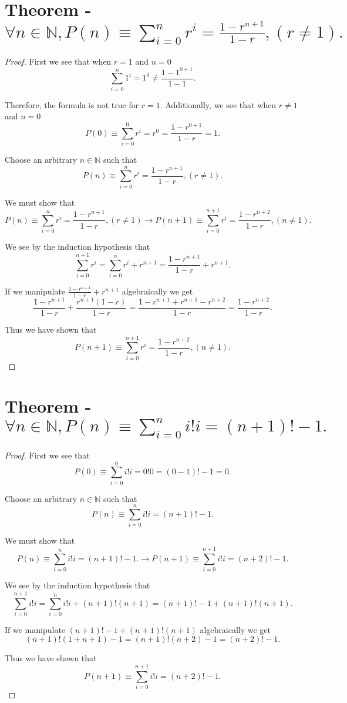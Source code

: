 \documentclass[11pt]{article}
\begin{document}
\section{Theorem - $\forall n\in\mathbb{N}, P(n)\equiv\sum_{i=0}^{n}r^{i}=\frac{1-r^{n+1}}{1-r}, (r\neq 1).$}
\begin{proof} 
First we see that when $r=1$ and $n=0$ $$\sum_{i=0}^{n}1^{i}=1^{0}\neq\frac{1-1^{0+1}}{1-1}.$$ 

Therefore, the formula is not true for $r=1$. Additionally, we see that when $r\neq 1$ and $n=0$ $$P(0)\equiv\sum_{i=0}^{0}r^{i}=r^{0}=\frac{1-r^{0+1}}{1-r}=1.$$

Choose an arbitrary $n\in\mathbb{N}$ such that $$P(n)\equiv\sum_{i=0}^{n}r^{i}=\frac{1-r^{n+1}}{1-r}, (r\neq 1).$$

We must show that $$P(n)\equiv\sum_{i=0}^{n}r^{i}=\frac{1-r^{n+1}}{1-r}, (r\neq 1)\longrightarrow P(n+1)\equiv\sum_{i=0}^{n+1}r^{i}=\frac{1-r^{n+2}}{1-r}, (n\neq 1).$$

We see by the induction hypothesis that $$\sum_{i=0}^{n+1}r^{i}=\sum_{i=0}^{n}r^{i}+r^{n+1}=\frac{1-r^{n+1}}{1-r}+r^{n+1}.$$

If we manipulate $\frac{1-r^{n+1}}{1-r}+r^{n+1}$ algebraically we get $$\frac{1-r^{n+1}}{1-r}+\frac{r^{n+1}(1-r)}{1-r}=\frac{1-r^{n+1}+r^{n+1}-r^{n+2}}{1-r}=\frac{1-r^{n+2}}{1-r}.$$

Thus we have shown that $$P(n+1)\equiv\sum_{i=0}^{n+1}r^{i}=\frac{1-r^{n+2}}{1-r}, (n\neq 1).$$
\end{proof}
\section{Theorem - $\forall n\in\mathbb{N}, P(n)\equiv\sum_{i=0}^{n}i!i=(n+1)!-1.$}
\begin{proof}
First we see that $$P(0)\equiv\sum_{i=0}^{0}i!i=0!0=(0-1)!-1=0.$$

Choose an arbitrary $n\in\mathbb{N}$ such that $$P(n)\equiv\sum_{i=0}^{n}i!i=(n+1)!-1.$$

We must show that $$P(n)\equiv\sum_{i=0}^{n}i!i=(n+1)!-1.\longrightarrow P(n+1)\equiv\sum_{i=0}^{n+1}i!i=(n+2)!-1.$$

We see by the induction hypothesis that $$\sum_{i=0}^{n+1}i!i=\sum_{i=0}^{n}i!i+(n+1)!(n+1)=(n+1)!-1+(n+1)!(n+1).$$

If we manipulate $(n+1)!-1+(n+1)!(n+1)$ algebraically we get $$(n+1)!(1+n+1)-1=(n+1)!(n+2)-1=(n+2)!-1.$$

Thus we have shown that $$P(n+1)\equiv\sum_{i=0}^{n+1}i!i=(n+2)!-1.$$
\end{proof}
\end{document}
